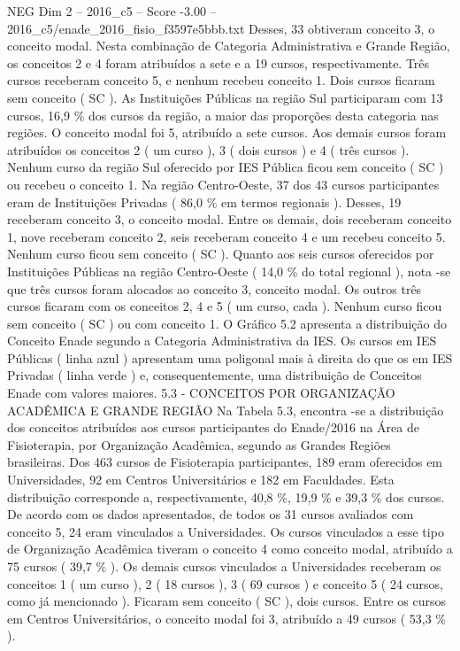 \begin{textsample}{NEG Dim 2 – 2016\_c5 – Score -3.00 – 2016\_c5/enade\_2016\_fisio\_f3597e5bbb.txt}
Desses, 33 obtiveram conceito 3, o conceito modal.
Nesta combinação de Categoria Administrativa e Grande Região, os conceitos 2 e 4 foram atribuídos a sete e a 19 cursos, respectivamente.
Três cursos receberam conceito 5, e nenhum recebeu conceito 1.
Dois cursos ficaram sem conceito ( SC ).
As Instituições Públicas na região Sul participaram com 13 cursos, 16,9 \% dos cursos da região, a maior das proporções desta categoria nas regiões.
O conceito modal foi 5, atribuído a sete cursos.
Aos demais cursos foram atribuídos os conceitos 2 ( um curso ), 3 ( dois cursos ) e 4 ( três cursos ).
Nenhum curso da região Sul oferecido por IES Pública ficou sem conceito ( SC ) ou recebeu o conceito 1.
Na região Centro-Oeste, 37 dos 43 cursos participantes eram de Instituições Privadas ( 86,0 \% em termos regionais ).
Desses, 19 receberam conceito 3, o conceito modal.
Entre os demais, dois receberam conceito 1, nove receberam conceito 2, seis receberam conceito 4 e um recebeu conceito 5.
Nenhum curso ficou sem conceito ( SC ).
Quanto aos seis cursos oferecidos por Instituições Públicas na região Centro-Oeste ( 14,0 \% do total regional ), nota -se que três cursos foram alocados ao conceito 3, conceito modal.
Os outros três cursos ficaram com os conceitos 2, 4 e 5 ( um curso, cada ).
Nenhum curso ficou sem conceito ( SC ) ou com conceito 1.
O Gráfico 5.2 apresenta a distribuição do Conceito Enade segundo a Categoria Administrativa da IES.
Os cursos em IES Públicas ( linha azul ) apresentam uma poligonal mais à direita do que os em IES Privadas ( linha verde ) e, consequentemente, uma distribuição de Conceitos Enade com valores maiores. 5.3 - CONCEITOS POR ORGANIZAÇÃO ACADÊMICA E GRANDE REGIÃO Na Tabela 5.3, encontra -se a distribuição dos conceitos atribuídos aos cursos participantes do Enade/2016 na Área de Fisioterapia, por Organização Acadêmica, segundo as Grandes Regiões brasileiras.
Dos 463 cursos de Fisioterapia participantes, 189 eram oferecidos em Universidades, 92 em Centros Universitários e 182 em Faculdades.
Esta distribuição corresponde a, respectivamente, 40,8 \%, 19,9 \% e 39,3 \% dos cursos.
De acordo com os dados apresentados, de todos os 31 cursos avaliados com conceito 5, 24 eram vinculados a Universidades.
Os cursos vinculados a esse tipo de Organização Acadêmica tiveram o conceito 4 como conceito modal, atribuído a 75 cursos ( 39,7 \% ).
Os demais cursos vinculados a Universidades receberam os conceitos 1 ( um curso ), 2 ( 18 cursos ), 3 ( 69 cursos ) e conceito 5 ( 24 cursos, como já mencionado ).
Ficaram sem conceito ( SC ), dois cursos.
Entre os cursos em Centros Universitários, o conceito modal foi 3, atribuído a 49 cursos ( 53,3 \% ).

\end{textsample}
